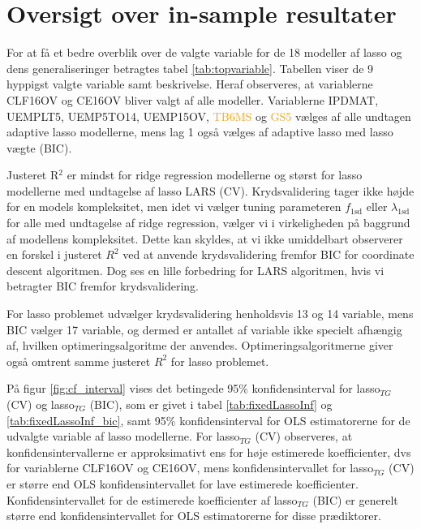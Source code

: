 \section{Oversigt over in-sample resultater} 
For at få et bedre overblik over de valgte variable for de 18 modeller af lasso og dens generaliseringer betragtes tabel \ref{tab:topvariable}.
Tabellen viser de 9 hyppigst valgte variable samt beskrivelse. 
Heraf observeres, at variablerne \textcolor{blue3}{CLF16OV} og \textcolor{blue3}{CE16OV} bliver valgt af alle modeller.
Variablerne \textcolor{chartreuse4}{IPDMAT}, \textcolor{blue3}{UEMPLT5}, \textcolor{blue3}{UEMP5TO14}, \textcolor{blue3}{UEMP15OV}, \textcolor{orange}{TB6MS} og \textcolor{orange}{GS5} vælges af alle undtagen adaptive lasso modellerne, mens \textcolor{blue3}{lag 1} også vælges af adaptive lasso med lasso vægte (BIC).



Justeret R$^2$ er mindst for ridge regression modellerne og størst for lasso modellerne med undtagelse af lasso LARS (CV).
Krydsvalidering tager ikke højde for en models kompleksitet, men idet vi vælger tuning parameteren \(f_\text{1sd}\) eller \(\lambda_\text{1sd}\) for alle med undtagelse af ridge regression, vælger vi i virkeligheden på baggrund af modellens kompleksitet.
Dette kan skyldes, at vi ikke umiddelbart observerer en forskel i justeret \(R^2\) ved at anvende krydsvalidering fremfor BIC for coordinate descent algoritmen.
Dog ses en lille forbedring for LARS algoritmen, hvis vi betragter BIC fremfor krydsvalidering.

For lasso problemet udvælger krydsvalidering henholdsvis 13 og 14 variable, mens BIC vælger 17 variable, og dermed er antallet af variable ikke specielt afhængig af, hvilken optimeringsalgoritme der anvendes.
Optimeringsalgoritmerne giver også omtrent samme justeret \(R^2\) for lasso problemet.


På figur \ref{fig:cf_interval} vises det betingede 95\% konfidensinterval for lasso\(_{TG}\) (CV) og lasso\(_{TG}\) (BIC), som er givet i tabel \ref{tab:fixedLassoInf} og \ref{tab:fixedLassoInf_bic}, samt 95\% konfidensinterval for OLS estimatorerne for de udvalgte variable af lasso modellerne. 
For lasso\(_{TG}\) (CV) observeres, at konfidensintervallerne er approksimativt ens for høje estimerede koefficienter, dvs for variablerne \textcolor{blue3}{CLF16OV} og \textcolor{blue3}{CE16OV}, mens  konfidensintervallet for lasso\(_{TG}\) (CV) er større end OLS konfidensintervallet for lave estimerede koefficienter.
Konfidensintervallet for de estimerede koefficienter af lasso\(_{TG}\) (BIC) er generelt større end konfidensintervallet for OLS estimatorerne for disse prædiktorer.

